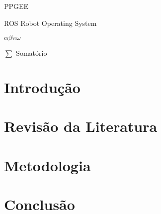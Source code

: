 \documentclass[repeatfields,xlists,xpacks,oneside,yearsonly]{ufrgscca}
\begin{document}
\listofcodelist %

\begin{listofabbrv}{PPGEE}
    \item[ROS] Robot Operating System
\end{listofabbrv}

\begin{listofsymbols}{$\alpha\beta\pi\omega$}
    \item[$\sum$] Somatório
\end{listofsymbols}

\tableofcontents


\chapter{Introdução}

\chapter{Revisão da Literatura}
\label{revisao}

\chapter{Metodologia}
\label{partes}

\chapter{Conclusão}
\label{conclusao}

\printbibliography

\begin{appendix}

\end{appendix}


\begin{annex}
\end{annex}
\end{document}
